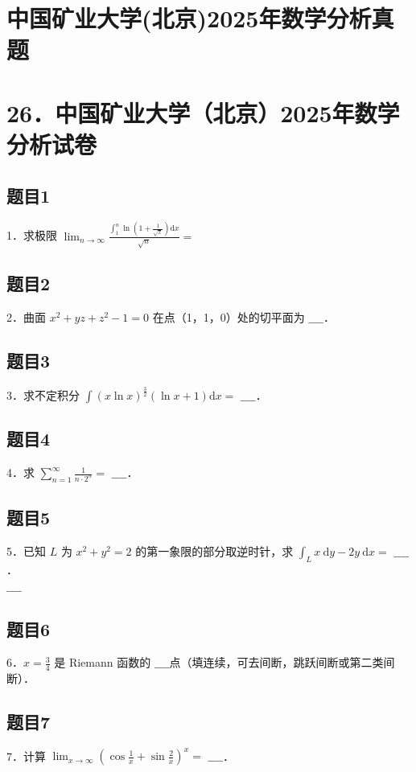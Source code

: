 \documentclass{article}
\begin{document}
\section*{中国矿业大学(北京)2025年数学分析真题}
\section*{26．中国矿业大学（北京）2025年数学分析试卷}

\subsection{题目1}
1．求极限 \(\lim _{n \rightarrow \infty} \frac{\int_{1}^{n} \ln \left(1+\frac{1}{\sqrt{x}}\right) \mathrm{d} x}{\sqrt{n}}=\)

\subsection{题目2}
2．曲面 \(x^{2}+y z+z^{2}-1=0\) 在点（1，1，0）处的切平面为 \(\_\_\_\_\)．

\subsection{题目3}
3．求不定积分 \(\int(x \ln x)^{\frac{3}{2}}(\ln x+1) \mathrm{d} x=\) \(\_\_\_\_\)．

\subsection{题目4}
4．求 \(\sum_{n=1}^{\infty} \frac{1}{n \cdot 2^{n}}=\) \(\_\_\_\_\)．

\subsection{题目5}
5．已知 \(L\) 为 \(x^{2}+y^{2}=2\) 的第一象限的部分取逆时针，求 \(\int_{L} x \mathrm{~d} y-2 y \mathrm{~d} x=\) \(\_\_\_\_\)．\\
\(\_\_\_\_\)

\subsection{题目6}
6．\(x=\frac{3}{4}\) 是 Riemann 函数的 \(\_\_\_\_\)点（填连续，可去间断，跳跃间断或第二类间断）．

\subsection{题目7}
7．计算 \(\lim _{x \rightarrow \infty}\left(\cos \frac{1}{x}+\sin \frac{2}{x}\right)^{x}=\) \(\_\_\_\_\)．
\end{document}
